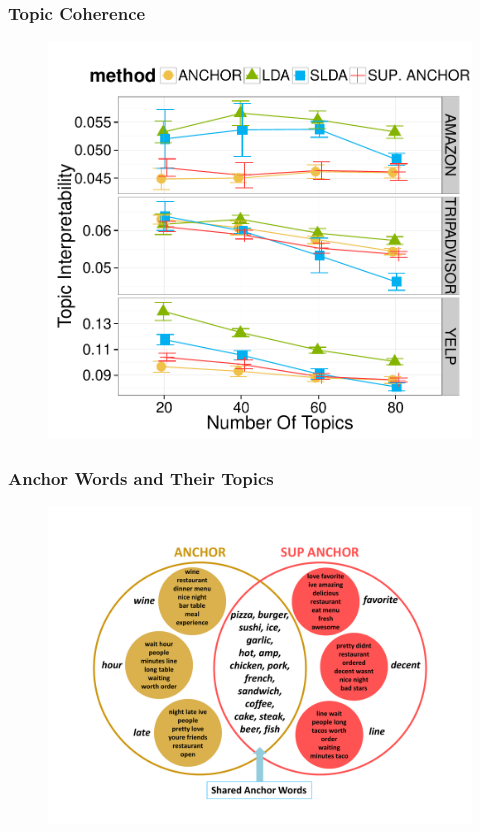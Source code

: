 \documentclass[compress]{beamer}
\newcommand{\abr}[1]{\textsc{#1}}
\newcommand{\lda}[0]{{\bf \textsc{\large{lda}}}}
\newcommand{\ank}[0]{{\bf \textsc{\large{anchor}}}}
\newcommand{\sank}[0]{{\bf \textsc{\large{sup~anchor}}}}
\begin{document}
\begin{frame}
\frametitle{Topic Coherence}
\begin{figure}
\centering
\includegraphics[width=0.65\linewidth]{spectral/topic_coherence_ERROR.pdf}
\end{figure}

\end{frame}


\begin{frame}
\frametitle{Anchor Words and Their Topics}
\begin{figure}
\centering
\includegraphics[width=0.8\linewidth]{spectral/venn_colors.pdf}
\end{figure}

\end{frame}
\end{document}
